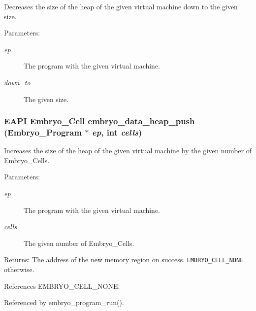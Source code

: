 Decreases the size of the heap of the given virtual machine down to the given size. 

\begin{Desc}
\item[Parameters:]
\begin{description}
\item[{\em ep}]The program with the given virtual machine. \item[{\em down\_\-to}]The given size. \end{description}
\end{Desc}
\hypertarget{group__Embryo__Heap__Group_g9dc1279d6ed98dfd66bed904e2dfadec}{
\subsubsection{\setlength{\rightskip}{0pt plus 5cm}EAPI Embryo\_\-Cell embryo\_\-data\_\-heap\_\-push (Embryo\_\-Program $\ast$ {\em ep}, \/  int {\em cells})}}
\label{group__Embryo__Heap__Group_g9dc1279d6ed98dfd66bed904e2dfadec}


Increases the size of the heap of the given virtual machine by the given number of Embryo\_\-Cells. 

\begin{Desc}
\item[Parameters:]
\begin{description}
\item[{\em ep}]The program with the given virtual machine. \item[{\em cells}]The given number of Embryo\_\-Cells. \end{description}
\end{Desc}
\begin{Desc}
\item[Returns:]The address of the new memory region on success. {\tt EMBRYO\_\-CELL\_\-NONE} otherwise. \end{Desc}


References EMBRYO\_\-CELL\_\-NONE.

Referenced by embryo\_\-program\_\-run().